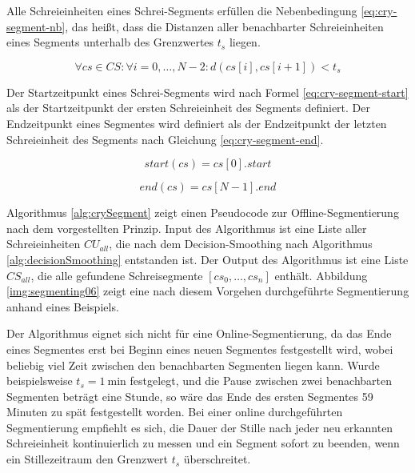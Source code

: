 Alle Schreieinheiten eines Schrei-Segments erfüllen die Nebenbedingung \ref{eq:cry-segment-nb}, das heißt, dass die Distanzen aller benachbarter Schreieinheiten eines Segments unterhalb des Grenzwertes $t_{s}$ liegen.


\begin{equation}
\forall cs \in CS: \forall i = 0 , \ldots , N-2 : d(cs[i], cs[i+1]) < t_{s}
\label{eq:cry-segment-nb}
\end{equation}

Der Startzeitpunkt eines Schrei-Segments wird nach Formel \ref{eq:cry-segment-start} als der Startzeitpunkt der ersten Schreieinheit des Segments definiert. Der Endzeitpunkt eines Segmentes wird definiert als der Endzeitpunkt der letzten Schreieinheit des Segments nach Gleichung \ref{eq:cry-segment-end}.

\begin{equation}
start(cs) = cs[0].start
\label{eq:cry-segment-start}
\end{equation}

\begin{equation}
end(cs) = cs[N-1].end
\label{eq:cry-segment-end}
\end{equation}

Algorithmus \ref{alg:crySegment} zeigt einen Pseudocode zur Offline-Segmentierung nach dem vorgestellten Prinzip. Input des Algorithmus ist eine Liste aller Schreieinheiten $CU_{all}$, die nach dem Decision-Smoothing nach Algorithmus \ref{alg:decisionSmoothing} entstanden ist. Der Output des Algorithmus ist eine Liste $CS_{all}$, die alle gefundene Schreisegmente  $[cs_0 , \ldots ,  cs_n]$ enthält. Abbildung \ref{img:segmenting06} zeigt eine nach diesem Vorgehen durchgeführte Segmentierung anhand eines Beispiels.

Der Algorithmus eignet sich nicht für eine Online-Segmentierung, da das Ende eines Segmentes erst bei Beginn eines neuen Segmentes festgestellt wird, wobei beliebig viel Zeit zwischen den benachbarten Segmenten liegen kann. Wurde beispielsweise $t_{s} = \SI{1}{\minute}$ festgelegt, und die Pause zwischen zwei benachbarten Segmenten beträgt eine Stunde, so wäre das Ende des ersten Segmentes 59 Minuten zu spät festgestellt worden. Bei einer online durchgeführten Segmentierung empfiehlt es sich, die Dauer der Stille nach jeder neu erkannten Schreieinheit kontinuierlich zu messen und ein Segment sofort zu beenden, wenn ein Stillezeitraum den Grenzwert $t_s$ überschreitet.


